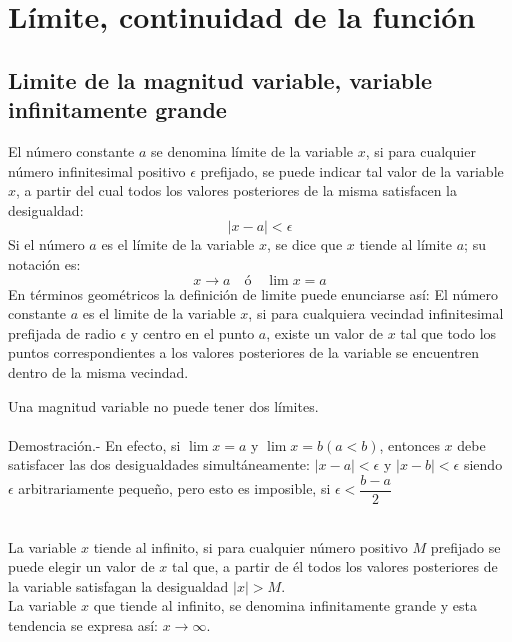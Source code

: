 \chapter{Límite, continuidad de la función}

\section{Limite de la magnitud variable, variable infinitamente grande}

    \begin{tcolorbox}[colframe = white]
	\begin{def.}
	    El número constante $a$ se denomina límite de la variable $x$, si para cualquier número infinitesimal positivo $\epsilon$ prefijado, se puede indicar tal valor de la variable $x$, a partir del cual todos los valores posteriores de la misma satisfacen la desigualdad: $$|x-a| < \epsilon$$ Si el número $a$ es el límite de la variable $x$, se dice que $x$ tiende al límite $a$; su notación es: $$x \longrightarrow a \quad ó \quad \lim x = a$$ En términos geométricos la definición de limite puede enunciarse así: El número constante $a$ es el limite de la variable $x$, si para cualquiera vecindad infinitesimal prefijada de radio $\epsilon$ y centro en el punto $a$, existe un valor de $x$ tal que todo los puntos correspondientes a los valores posteriores de la variable se encuentren dentro de la misma vecindad.
	\end{def.}
    \end{tcolorbox}

    \begin{teo}
	Una magnitud variable no puede tener dos límites.\\\\
	    Demostración.-\; En efecto, si $\lim x = a$ y $\lim x = b (a<b)$, entonces $x$ debe satisfacer las dos desigualdades simultáneamente: $|x-a|<\epsilon$ y $|x-b|<\epsilon$ siendo $\epsilon$ arbitrariamente pequeño, pero esto es imposible, si $\epsilon < \dfrac{b-a}{2}$\\\\
    \end{teo}

    \begin{tcolorbox}[colframe = white]
	\begin{def.}
	    La variable $x$ tiende al infinito, si para cualquier número positivo $M$ prefijado se puede elegir un valor de $x$ tal que, a partir de él todos los valores posteriores de la variable satisfagan la desigualdad $|x|>M$.\\
	    La variable $x$ que tiende al infinito, se denomina infinitamente grande y esta tendencia se expresa así: $x \longrightarrow \infty$. 
	\end{def.}
    \end{tcolorbox}

